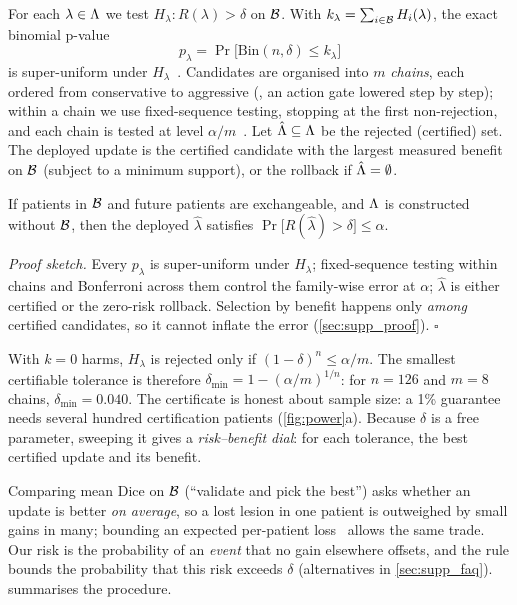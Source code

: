 For each $\lambda\in\Lambda$ we test $H_\lambda: R(\lambda)>\delta$ on $\mathcal{B}$.
With $k_\lambda=\sum_{i\in\mathcal{B}}H_i(\lambda)$, the exact binomial p-value
\begin{equation}
p_\lambda=\Pr\big[\mathrm{Bin}(n,\delta)\le k_\lambda\big]
\label{eq:pval}
\end{equation}
is super-uniform under $H_\lambda$~\cite{angelopoulos2021ltt}.
Candidates are organised into $m$ \emph{chains}, each ordered from conservative to aggressive (\eg, an action gate lowered step by step); within a chain we use fixed-sequence testing, stopping at the first non-rejection, and each chain is tested at level $\alpha/m$~\cite{bretz2010multiple}.
Let $\hat{\Lambda}\subseteq\Lambda$ be the rejected (certified) set.
The deployed update is the certified candidate with the largest measured benefit on $\mathcal{B}$ (subject to a minimum support), or the rollback if $\hat{\Lambda}=\emptyset$.

\begin{theorem}
If patients in $\mathcal{B}$ and future patients are exchangeable, and $\Lambda$ is constructed without $\mathcal{B}$, then the deployed $\hat\lambda$ satisfies
$\Pr\big[R(\hat\lambda)>\delta\big]\le\alpha$.
\label{thm:ltt}
\end{theorem}
\noindent\emph{Proof sketch.} Every $p_\lambda$ is super-uniform under $H_\lambda$; fixed-sequence testing within chains and Bonferroni across them control the family-wise error at $\alpha$; $\hat\lambda$ is either certified or the zero-risk rollback.
Selection by benefit happens only \emph{among} certified candidates, so it cannot inflate the error (\cref{sec:supp_proof}). \hfill$\square$

 With $k=0$ harms, $H_\lambda$ is rejected only if $(1-\delta)^n\le\alpha/m$.
The smallest certifiable tolerance is therefore $\delta_{\min}=1-(\alpha/m)^{1/n}$: for $n=126$ and $m=8$ chains, $\delta_{\min}=0.040$.
The certificate is honest about sample size: a 1\% guarantee needs several hundred certification patients (\cref{fig:power}a).
Because $\delta$ is a free parameter, sweeping it gives a \emph{risk--benefit dial}: for each tolerance, the best certified update and its benefit.

Comparing mean Dice on $\mathcal{B}$ (``validate and pick the best'') asks whether an update is better \emph{on average}, so a lost lesion in one patient is outweighed by small gains in many; bounding an expected per-patient loss~\cite{angelopoulos2024crc} allows the same trade.
Our risk is the probability of an \emph{event} that no gain elsewhere offsets, and the rule bounds the probability that this risk exceeds $\delta$ (alternatives in \cref{sec:supp_faq}).
 summarises the procedure.

